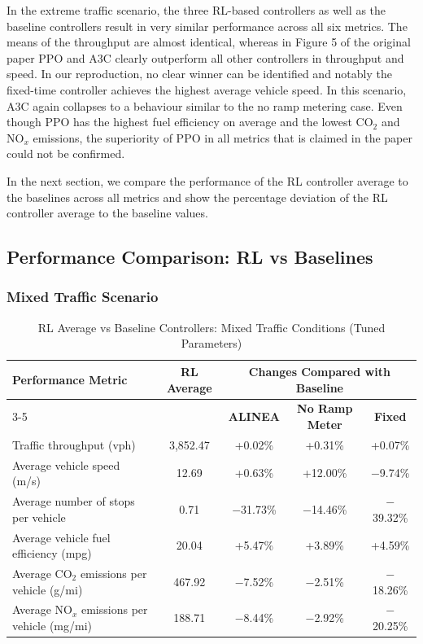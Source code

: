 In the extreme traffic scenario, the three RL-based controllers as well as the baseline controllers result in very similar performance across all six metrics. 
The means of the throughput are almost identical, whereas in Figure 5 of the original paper PPO and A3C 
clearly outperform all other controllers in throughput and speed. In our reproduction, no clear winner 
can be identified and notably the fixed-time controller achieves the highest average vehicle speed.
In this scenario, A3C again collapses to a behaviour similar to the no ramp metering case.
Even though PPO has the highest fuel efficiency on average and the lowest CO$_2$ and NO$_x$ emissions, the superiority of PPO in all metrics that is claimed in the paper could not be confirmed. 

\medskip

In the next section, we compare the performance of the RL controller average to the baselines across all metrics and show the percentage deviation of the RL controller average to the baseline values. 

\subsection{Performance Comparison: RL vs Baselines}


\subsubsection{Mixed Traffic Scenario}

\begin{table}[H]
\centering
\small
\caption{RL Average vs Baseline Controllers: Mixed Traffic Conditions (Tuned Parameters)}
\begin{tabular}{l c c c c}
\toprule
\multirow{2}{*}{\textbf{Performance Metric}} & \multirow{2}{*}{\textbf{RL Average}} & \multicolumn{3}{c}{\textbf{Changes Compared with Baseline}} \\
\cmidrule(lr){3-5}
 & & \textbf{ALINEA} & \textbf{No Ramp Meter} & \textbf{Fixed} \\
\midrule
Traffic throughput (vph)                      & 3{,}852.47 & +0.02\% & +0.31\%  & +0.07\%  \\
Average vehicle speed (m/s)                   & 12.69      & +0.63\% & +12.00\% & $-$9.74\%  \\
Average number of stops per vehicle           & 0.71       & $-$31.73\% & $-$14.46\% & $-$39.32\% \\
Average vehicle fuel efficiency (mpg)         & 20.04      & +5.47\% & +3.89\%  & +4.59\%  \\
Average CO$_2$ emissions per vehicle (g/mi)   & 467.92     & $-$7.52\% & $-$2.51\%  & $-$18.26\% \\
Average NO$_x$ emissions per vehicle (mg/mi)  & 188.71     & $-$8.44\% & $-$2.92\%  & $-$20.25\% \\
\bottomrule
\end{tabular}
\end{table}

